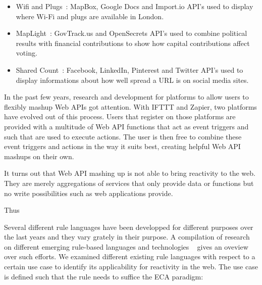\begin{itemize}
  \item Wifi and Plugs~\cite{wwwWifiAndPlugs}: MapBox, Google Docs and Import.io API's used to display where Wi-Fi and plugs are available in London.
  \item MapLight~\cite{wwwMapLight}: GovTrack.us and OpenSecrets API's used to combine political results with financial contributions to show how capital contributions affect voting.
  \item Shared Count~\cite{wwwSharedCount}: Facebook, LinkedIn, Pinterest and Twitter API's used to display informations about how well spread a URL is on social media sites.
\end{itemize}

In the past few years, research and development for platforms to allow users to flexibly mashup Web APIs got attention.
With IFTTT and Zapier, two platforms have evolved out of this process.
Users that register on those platforms are provided with a multitude of Web API functions that act as event triggers and such that are used to execute actions.
The user is then free to combine these event triggers and actions in the way it suits best, creating helpful Web API mashups on their own.






It turns out that Web API mashing up is not able to bring reactivity to the web.
They are merely aggregations of services that only provide data or functions but no write possibilities such as web applications provide.

Thus 





Several different rule languages have been developped for different purposes over the last years and they vary grately in their purpose.
A compilation of research on different emerging rule-based languages and technologies ~\cite{2009-Paschke_Boley-RCER.pdf} gives an oveview over such efforts.
We examined different existing rule languages with respect to a certain use case to identify its applicability for reactivity in the web. %
The use case is defined such that the rule needs to suffice the ECA paradigm:

